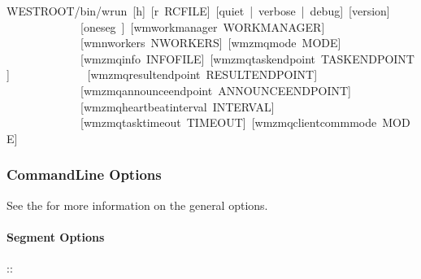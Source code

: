 \documentclass[letterpaper,10pt,english]{sphinxmanual}
\begin{document}
\begin{sphinxVerbatim}[commandchars=\\\{\}]
\PYGZdl{}WEST\PYGZus{}ROOT/bin/w\PYGZus{}run [\PYGZhy{}h] [\PYGZhy{}r RCFILE] [\PYGZhy{}\PYGZhy{}quiet | \PYGZhy{}\PYGZhy{}verbose | \PYGZhy{}\PYGZhy{}debug] [\PYGZhy{}\PYGZhy{}version]
             [\PYGZhy{}\PYGZhy{}oneseg ] [\PYGZhy{}\PYGZhy{}wm\PYGZhy{}work\PYGZhy{}manager WORK\PYGZus{}MANAGER]
             [\PYGZhy{}\PYGZhy{}wm\PYGZhy{}n\PYGZhy{}workers N\PYGZus{}WORKERS] [\PYGZhy{}\PYGZhy{}wm\PYGZhy{}zmq\PYGZhy{}mode MODE]
             [\PYGZhy{}\PYGZhy{}wm\PYGZhy{}zmq\PYGZhy{}info INFO\PYGZus{}FILE] [\PYGZhy{}\PYGZhy{}wm\PYGZhy{}zmq\PYGZhy{}task\PYGZhy{}endpoint TASK\PYGZus{}ENDPOINT]
             [\PYGZhy{}\PYGZhy{}wm\PYGZhy{}zmq\PYGZhy{}result\PYGZhy{}endpoint RESULT\PYGZus{}ENDPOINT]
             [\PYGZhy{}\PYGZhy{}wm\PYGZhy{}zmq\PYGZhy{}announce\PYGZhy{}endpoint ANNOUNCE\PYGZus{}ENDPOINT]
             [\PYGZhy{}\PYGZhy{}wm\PYGZhy{}zmq\PYGZhy{}heartbeat\PYGZhy{}interval INTERVAL]
             [\PYGZhy{}\PYGZhy{}wm\PYGZhy{}zmq\PYGZhy{}task\PYGZhy{}timeout TIMEOUT] [\PYGZhy{}\PYGZhy{}wm\PYGZhy{}zmq\PYGZhy{}client\PYGZhy{}comm\PYGZhy{}mode MODE]
\end{sphinxVerbatim}


\subsubsection{Command\sphinxhyphen{}Line Options}
\label{\detokenize{users_guide/command_line_tools/w_run:command-line-options}}
See the {\hyperref[\detokenize{users_guide/command_line_tools:command-line-tool-index}]{}} for
more information on the general options.


\paragraph{Segment Options}
\label{\detokenize{users_guide/command_line_tools/w_run:segment-options}}\begin{description}
\item[{::}] \leavevmode{}

\end{description}
\end{document}
